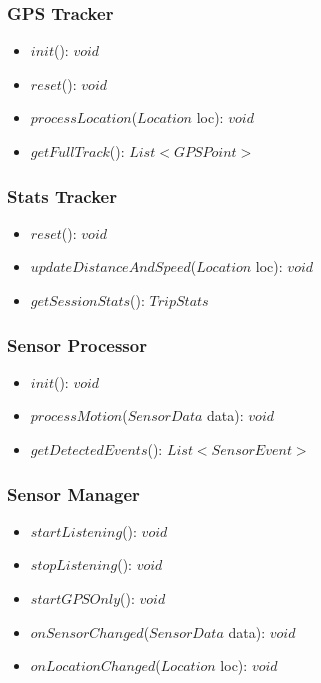 \subsubsection*{GPS Tracker}
\begin{itemize}
    \item $init$(): $void$
    \item $reset$(): $void$
    \item $processLocation$($Location$ loc): $void$
    \item $getFullTrack$(): $List<GPSPoint>$
\end{itemize}

\subsubsection*{Stats Tracker}
\begin{itemize}
    \item $reset$(): $void$
    \item $updateDistanceAndSpeed$($Location$ loc): $void$
    \item $getSessionStats$(): $TripStats$
\end{itemize}

\subsubsection*{Sensor Processor}
\begin{itemize}
    \item $init$(): $void$
    \item $processMotion$($SensorData$ data): $void$
    \item $getDetectedEvents$(): $List<SensorEvent>$
\end{itemize}

\subsubsection*{Sensor Manager}
\begin{itemize}
    \item $startListening$(): $void$
    \item $stopListening$(): $void$
    \item $startGPSOnly$(): $void$
    \item $onSensorChanged$($SensorData$ data): $void$
    \item $onLocationChanged$($Location$ loc): $void$
\end{itemize}

